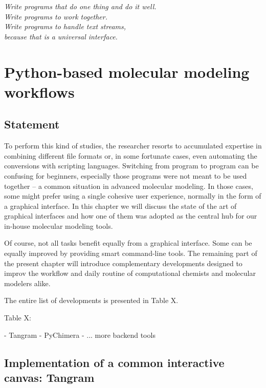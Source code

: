 \begin{savequote}[75mm]
	\itshape Write programs that do one thing and do it well. \\
	\itshape Write programs to work together. \\
	\itshape Write programs to handle text streams, \\
	\itshape because that is a universal interface.
\end{savequote}

\chapter{Python-based molecular modeling workflows}
\label{chap:05}

\section{Statement}

To perform this kind of studies, the researcher resorts to accumulated expertise in combining different file formats or, in some fortunate cases, even automating the conversions with scripting languages. Switching from program to program can be confusing for beginners, especially those programs were not meant to be used together – a common situation in advanced molecular modeling. In those cases, some might prefer using a single cohesive user experience, normally in the form of a graphical interface. In this chapter we will discuss the state of the art of graphical interfaces and how one of them was adopted as the central hub for our in-house molecular modeling tools.

Of course, not all tasks benefit equally from a graphical interface. Some can be equally improved by providing smart command-line tools. The remaining part of the present chapter will introduce complementary developments designed to improv the workflow and daily routine of computational chemists and molecular modelers alike.

The entire list of developments is presented in Table X. 

Table X:

- Tangram
- PyChimera
- ... more backend tools

\section{Implementation of a common interactive canvas: Tangram}

